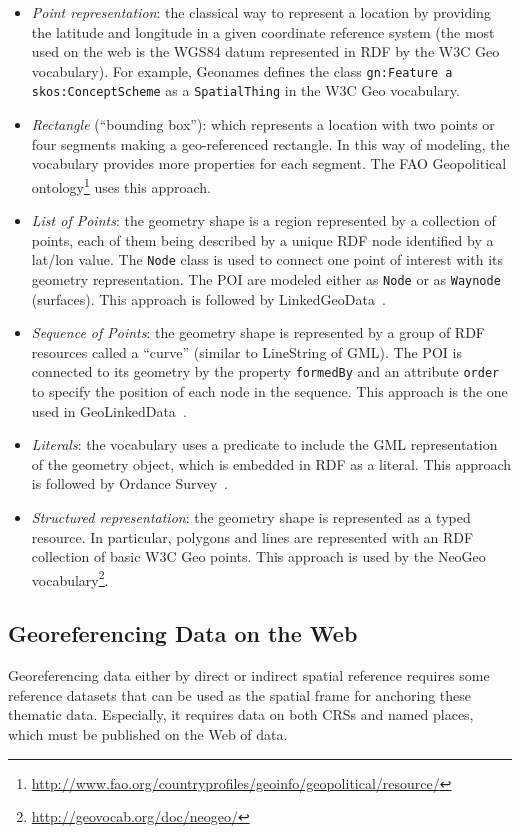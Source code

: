 \begin{itemize}
  \item \textit{Point representation}: the classical way to represent a location by providing the latitude and longitude in a given coordinate reference system (the most used on the web is the WGS84 datum represented in RDF by the W3C Geo vocabulary). For example, Geonames defines the class \texttt{gn:Feature a skos:ConceptScheme} as a \texttt{SpatialThing} in the W3C Geo vocabulary.
  \item \textit{Rectangle} (``bounding box''): which represents a location with two points or four segments making a geo-referenced rectangle. In this way of modeling, the vocabulary provides more properties for each segment. The FAO Geopolitical ontology\footnote{\url{http://www.fao.org/countryprofiles/geoinfo/geopolitical/resource/}} uses this approach.
  \item \textit{List of Points}: the geometry shape is a region represented by a collection of points, each of them being described by a unique RDF node identified by a lat/lon value. The \texttt{Node} class is used to connect one point of interest with its geometry representation. The POI are modeled either as \texttt{Node} or as \texttt{Waynode} (surfaces). This approach is followed by LinkedGeoData~\cite{linkedgeodata}.
  \item \textit{Sequence of Points}: the geometry shape is represented by a group of RDF resources called a ``curve'' (similar to LineString of GML). The POI is connected to its geometry by the property \texttt{formedBy} and an attribute \texttt{order} to specify the position of each node in the sequence. This approach is the one used in GeoLinkedData~\cite{deLeon2010}.
  \item \textit{Literals}: the vocabulary uses a predicate to include the GML representation of the geometry object, which is embedded in RDF as a literal. This approach is followed by Ordance Survey~\cite{Goodwin2008}.
  \item \textit{Structured representation}: the geometry shape is represented as a typed resource. In particular, polygons and lines are represented with an RDF collection of basic W3C Geo points. This approach is used by the NeoGeo vocabulary\footnote{\url{http://geovocab.org/doc/neogeo/}}.
\end{itemize}




\subsection{Georeferencing Data on the Web}
\label{sec:georef}
Georeferencing data either by direct or indirect spatial reference requires some reference datasets that can be used as the spatial frame for anchoring these thematic data. Especially, it requires data on both CRSs and named places, which must be published on the Web of data.

